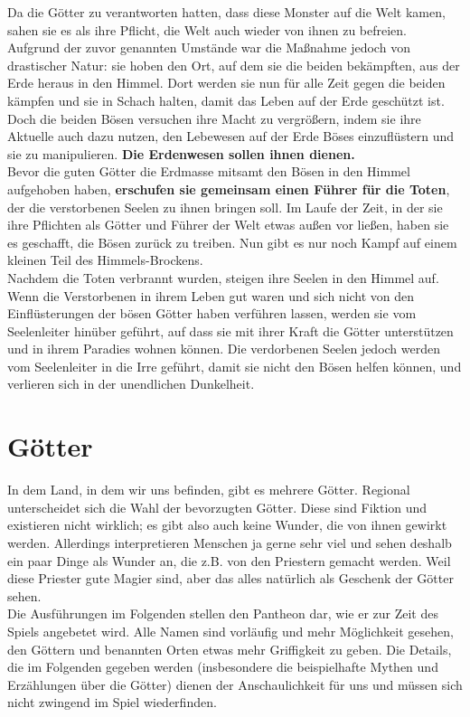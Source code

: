 Da die Götter zu verantworten hatten, dass diese Monster auf die Welt kamen, sahen sie es als ihre Pflicht, die Welt auch wieder von ihnen zu befreien. Aufgrund der zuvor genannten Umstände war die Maßnahme jedoch von drastischer Natur: sie hoben den Ort, auf dem sie die beiden bekämpften, aus der Erde heraus in den Himmel. Dort werden sie nun für alle Zeit gegen die beiden kämpfen und sie in Schach halten, damit das Leben auf der Erde geschützt ist.\\
Doch die beiden Bösen versuchen ihre Macht zu vergrößern, indem sie ihre Aktuelle auch dazu nutzen, den Lebewesen auf der Erde Böses einzuflüstern und sie zu manipulieren. \textbf{Die Erdenwesen sollen ihnen dienen.}\\
Bevor die guten Götter die Erdmasse mitsamt den Bösen in den Himmel aufgehoben haben, \textbf{erschufen sie gemeinsam einen Führer für die Toten}, der die verstorbenen Seelen zu ihnen bringen soll. Im Laufe der Zeit, in der sie ihre Pflichten als Götter und Führer der Welt etwas außen vor ließen, haben sie es geschafft, die Bösen zurück zu treiben. Nun gibt es nur noch Kampf auf einem kleinen Teil des Himmels-Brockens.\\
Nachdem die Toten verbrannt wurden, steigen ihre Seelen in den Himmel auf. Wenn die Verstorbenen in ihrem Leben gut waren und sich nicht von den Einflüsterungen der bösen Götter haben verführen lassen, werden sie vom Seelenleiter hinüber geführt, auf dass sie mit ihrer Kraft die Götter unterstützen und in ihrem Paradies wohnen können. Die verdorbenen Seelen jedoch werden vom Seelenleiter in die Irre geführt, damit sie nicht den Bösen helfen können, und verlieren sich in der unendlichen Dunkelheit.

\section{Götter}
In dem Land, in dem wir uns befinden, gibt es mehrere Götter. Regional unterscheidet sich die Wahl der bevorzugten Götter.
Diese sind Fiktion und existieren nicht wirklich; es gibt also auch keine Wunder, die von ihnen gewirkt werden. Allerdings interpretieren Menschen ja gerne sehr viel und sehen deshalb ein paar Dinge als Wunder an, die z.B. von den Priestern gemacht werden. Weil diese Priester gute Magier sind, aber das alles natürlich als Geschenk der Götter sehen.\\

Die Ausführungen im Folgenden stellen den Pantheon dar, wie er zur Zeit des Spiels angebetet wird. Alle Namen sind vorläufig und mehr Möglichkeit gesehen, den Göttern und 
benannten Orten etwas mehr Griffigkeit zu geben. Die Details, die im Folgenden gegeben werden (insbesondere die beispielhafte Mythen und Erzählungen über die Götter) dienen 
der Anschaulichkeit für uns und müssen sich nicht zwingend im Spiel wiederfinden.

